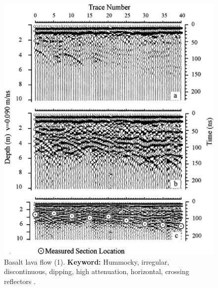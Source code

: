 \begin{figure}[h!]
    \centering
    \includegraphics[width=0.9\linewidth]{Figures/0.2GPR/Russel1996_volcanic_deposits_1.png}
    \caption[Basalt lava flow (1).]{Basalt lava flow (1). \textbf{Keyword:} Hummocky, irregular, discontinuous, dipping, high attenuation, horizontal, crossing reflectors \citep{Russell1997}.}
    \label{fig:Russell1996-1}
\end{figure}

